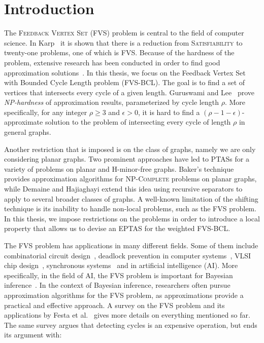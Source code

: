 \section{Introduction}

The \textsc{Feedback Vertex Set} (\textsc{FVS}) problem is central to the field of computer 
science. 
In Karp~\cite{Karp1972} 
it is shown that there is a reduction from \textsc{Satisfiability} to twenty-one problems, 
one of which is FVS. Because of the 
hardness of the problem, extensive research has been conducted in order to find good 
approximation solutions~\cite{bafna1995constant,bar1998approximation,becker1996optimization,chudak1998primal,goemans1998primal}. 
In this thesis, we focus on the Feedback Vertex Set with Bounded Cycle Length problem (FVS-BCL).
The goal is to find a set of vertices that intersects every cycle of a given length. 
Guruswami and Lee~\cite{guruswami2014inapproximability} prove \emph{NP-hardness} of 
approximation results, parameterized by cycle length $\rho$. More specifically, 
for any 
integer $\rho \geq 3$ and $\epsilon > 0$, it is hard to find a
$\left(\rho-1-\epsilon\right)$-approximate solution to the problem of intersecting every 
cycle of length $\rho$ in general graphs.

Another restriction 
that is imposed is on the class of graphs, namely we are only considering planar graphs. 
Two prominent approaches have led to PTASs for a variety of problems on planar and 
H-minor-free graphs. Baker's technique \cite{Baker} provides approximation algorithms for 
\textsc{NP-Complete} problems on planar graphs, while Demaine and Hajiaghayi 
\cite{demaine2005bidimensionality} extend this idea using recursive separators to apply to 
several broader classes of graphs. A well-known limitation of the shifting technique is its 
inability to handle non-local problems, such as the FVS problem.
In this thesis, we impose restrictions on 
the problems in order to introduce a local property that allows us to devise an 
EPTAS for the weighted FVS-BCL.

The \textsc{FVS} problem has applications in many different fields. 
Some of them include combinatorial circuit design~\cite{johnson1975finding}, deadlock prevention 
in computer systems~\cite{lloyd1988locating, shaw1978software}, 
VLSI chip design~\cite{gupta1989ballast,kunzmann1990analytical},
synchronous systems~\cite{luccio1998almost} 
and in artificial intelligence (AI). More specifically, in the field of AI, the FVS problem is important 
for Bayesian inference~\cite{bar1998approximation,becker1996optimization}. 
In the context of Bayesian inference, researchers often pursue approximation algorithms for the 
FVS problem, as approximations provide a practical and effective approach.
A survey on the FVS problem and its applications by Festa et al.~\cite{festa2012feedback} gives more 
details on everything mentioned so far. The same survey argues that detecting cycles 
is an expensive operation, but ends its argument with:

